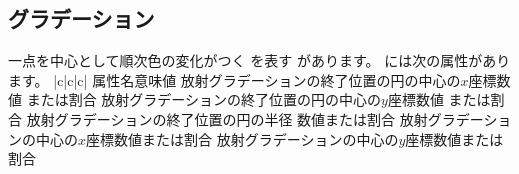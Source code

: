 \subsection{グラデーション}
一点を中心として順次色の変化がつく
を表す
があります。
%
には次の属性があります。
{|c|c|c|}{%
{属性名}{意味}{値}
{}{放射グラデーションの終了位置の円の中心の$x$座標}{数値
または割合}
{}{放射グラデーションの終了位置の円の中心の$y$座標}{数値
または割合}
{}{放射グラデーションの終了位置の円の半径 }{数値または割合}
{}{放射グラデーションの中心の$x$座標}{数値または割合}
{}{放射グラデーションの中心の$y$座標}{数値または割合}}


